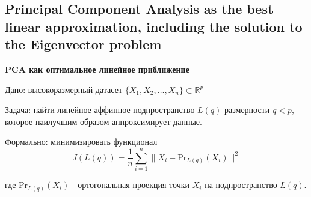 \documentclass[a4paper,12pt]{article}
\begin{document}
\subsection{Principal Component Analysis as the best linear approximation, including the solution to the Eigenvector problem}

\textbf{PCA как оптимальное линейное приближение}

Дано: высокоразмерный датасет $\{X_1, X_2, \ldots, X_n\} \subset \mathbb{R}^p$

Задача: найти линейное аффинное подпространство $L(q)$ размерности $q < p$, которое наилучшим образом аппроксимирует данные.

Формально: минимизировать функционал
$$J(L(q)) = \frac{1}{n} \sum_{i=1}^n \|X_i - \text{Pr}_{L(q)}(X_i)\|^2$$

где $\text{Pr}_{L(q)}(X_i)$ - ортогональная проекция точки $X_i$ на подпространство $L(q)$.
\end{document}
